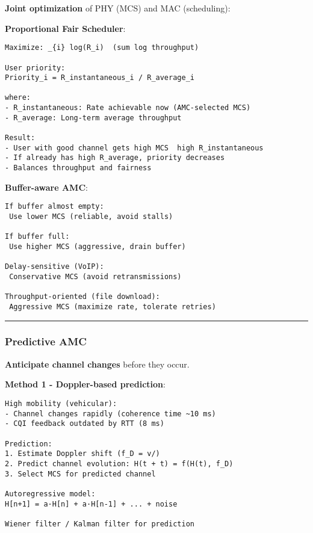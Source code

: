 \textbf{Joint optimization} of PHY (MCS) and MAC (scheduling):

\textbf{Proportional Fair Scheduler}:

\begin{verbatim}
Maximize: _{i} log(R_i)  (sum log throughput)

User priority:
Priority_i = R_instantaneous_i / R_average_i

where:
- R_instantaneous: Rate achievable now (AMC-selected MCS)
- R_average: Long-term average throughput

Result:
- User with good channel gets high MCS  high R_instantaneous
- If already has high R_average, priority decreases
- Balances throughput and fairness
\end{verbatim}

\textbf{Buffer-aware AMC}:

\begin{verbatim}
If buffer almost empty:
 Use lower MCS (reliable, avoid stalls)

If buffer full:
 Use higher MCS (aggressive, drain buffer)

Delay-sensitive (VoIP):
 Conservative MCS (avoid retransmissions)

Throughput-oriented (file download):
 Aggressive MCS (maximize rate, tolerate retries)
\end{verbatim}

\begin{center}\rule{0.5\linewidth}{0.5pt}\end{center}

\subsubsection{Predictive AMC}\label{predictive-amc}

\textbf{Anticipate channel changes} before they occur.

\textbf{Method 1 - Doppler-based prediction}:

\begin{verbatim}
High mobility (vehicular):
- Channel changes rapidly (coherence time ~10 ms)
- CQI feedback outdated by RTT (8 ms)

Prediction:
1. Estimate Doppler shift (f_D = v/)
2. Predict channel evolution: H(t + t) = f(H(t), f_D)
3. Select MCS for predicted channel

Autoregressive model:
H[n+1] = a·H[n] + a·H[n-1] + ... + noise

Wiener filter / Kalman filter for prediction
\end{verbatim}

